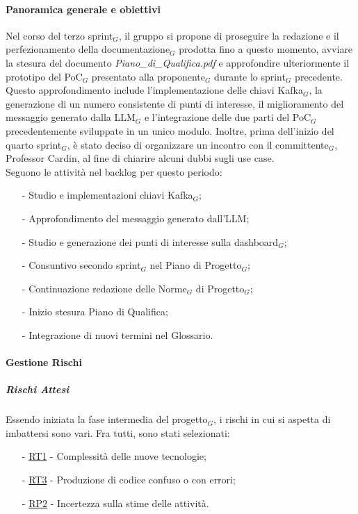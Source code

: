 \documentclass[10pt]{article}
\begin{document}
{{{{    \paragraph{Panoramica generale e obiettivi}\mbox{}\vspace{0.4em}

    Nel corso del terzo sprint$_G$, il gruppo si propone di proseguire la redazione e il perfezionamento della documentazione$_G$ prodotta fino a questo momento, avviare la stesura del documento \textit{Piano\_di\_Qualifica.pdf} e approfondire ulteriormente il prototipo del PoC$_G$ presentato alla proponente$_G$ durante lo sprint$_G$ precedente. Questo approfondimento include l'implementazione delle chiavi Kafka$_G$, la generazione di un numero consistente di punti di interesse, il miglioramento del messaggio generato dalla LLM$_G$ e l'integrazione delle due parti del PoC$_G$ precedentemente sviluppate in un unico modulo. Inoltre, prima dell'inizio del quarto sprint$_G$, è stato deciso di organizzare un incontro con il committente$_G$, Professor Cardin, al fine di chiarire alcuni dubbi sugli use case.\\
    Seguono le attività nel backlog per questo periodo:
    \vspace{-0.5em}
    \begin{itemize}
    \setlength\itemsep{-0.2em}
    \item [-] Studio e implementazioni chiavi Kafka$_G$;
    \item [-] Approfondimento del messaggio generato dall'LLM;
    \item [-] Studio e generazione dei punti di interesse sulla dashboard$_G$;
    \item [-] Consuntivo secondo sprint$_G$ nel Piano di Progetto$_G$;
    \item [-] Continuazione redazione delle Norme$_G$ di Progetto$_G$;
    \item [-] Inizio stesura Piano di Qualifica;
    \item [-] Integrazione di nuovi termini nel Glossario.
    \end{itemize}

    \paragraph{Gestione Rischi}\mbox{}
    \vspace{-1em}
    \subparagraph*{Rischi Attesi}\mbox{}
    Essendo iniziata la fase intermedia del progetto$_G$, i rischi in cui si aspetta di imbattersi sono vari. Fra tutti, sono stati selezionati:
    \vspace{-0.5em}
    \begin{itemize}
    \setlength\itemsep{-0.2em}
    \item [-] \hyperref[RT1]{RT1} - Complessità delle nuove tecnologie;
    \item [-] \hyperref[RT3]{RT3} - Produzione di codice confuso o con errori;
    \item [-] \hyperref[RP2]{RP2} - Incertezza sulla stime delle attività.
    \end{itemize}

}}}}
\end{document}
